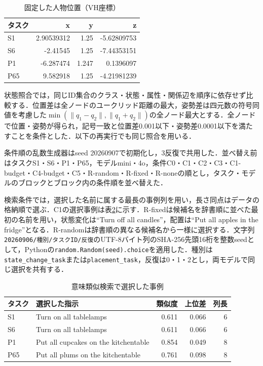 \begin{table}[tb]
\caption{固定した人物位置（VH座標）}\label{tab:fixed_positions_internal}
\centering\small
\setlength{\tabcolsep}{3pt}
\begin{tabular}{lrrr}
\hline
タスク & x & y & z \\
\hline
S1 & 2.90539312 & 1.25 & -5.62809753 \\
S6 & -2.41545 & 1.25 & -7.44353151 \\
P1 & -6.287474 & 1.247 & 0.1396097 \\
P65 & 9.582918 & 1.25 & -4.21981239 \\
\hline
\end{tabular}
\end{table}

状態照合では，同じID集合のクラス・状態・属性・関係辺を順序に依存せず比較する．位置差は全ノードのユークリッド距離の最大，姿勢差は四元数の符号同値を考慮した$\min(\|q_1-q_2\|,\|q_1+q_2\|)$の全ノード最大とする．全ノードで位置・姿勢が得られ，記号一致と位置差0.001以下・姿勢差0.0001以下を満たすことを条件とした．以下の再実行でも同じ照合を用いる．

条件順の乱数生成器はseed 20260907で初期化し，3反復で共用した．並べ替え前はタスクS1・S6・P1・P65，モデルmini・4o，条件C0・C1・C2・C3・C1-budget・C4-budget・C5・R-random・R-fixed・R-noneの順とし，タスク・モデルのブロックとブロック内の条件順を並べ替えた．

検索条件では，選択した名前に属する最長の事例列を用い，長さ同点はデータの格納順で選ぶ．C1の選択事例は表\ref{tab:semantic_internal}に示す．R-fixedは候補名を辞書順に並べた最初の名前を用い，状態変化は``Turn off all candles''，配置は``Put all apples in the fridge''となる．R-randomは辞書順の異なる候補名から一様に選択する．文字列\texttt{20260906/種別/タスクID/反復}のUTF-8バイト列のSHA-256先頭16桁を整数seedとして，Pythonの\texttt{random.Random(seed).choice}を適用した．種別は\texttt{state\_change\_task}または\texttt{placement\_task}，反復は0・1・2とし，両モデルで同じ選択を共有する．

\begin{table}[tb]
\caption{意味類似検索で選択した事例}\label{tab:semantic_internal}
\centering\small
\setlength{\tabcolsep}{3pt}
\begin{tabular}{lp{}rrr}
\hline
タスク & 選択した指示 & 類似度 & 上位差 & 列長 \\
\hline
S1 & Turn on all tablelamps & 0.611 & 0.066 & 6 \\
S6 & Turn on all tablelamps & 0.611 & 0.066 & 6 \\
P1 & Put all cupcakes on the kitchentable & 0.854 & 0.049 & 8 \\
P65 & Put all plums on the kitchentable & 0.761 & 0.098 & 8 \\
\hline
\end{tabular}
\end{table}

